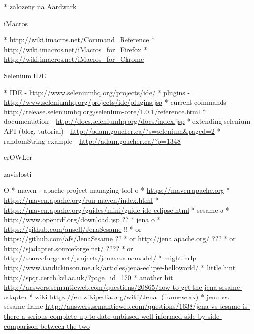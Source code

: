 \begitems
  * zalozeny na Aardwark 
\enditems


\secc iMacros

\begitems
  * \url{http://wiki.imacros.net/Command_Reference}
  * \url{http://wiki.imacros.net/iMacros_for_Firefox}
  * \url{http://wiki.imacros.net/iMacros_for_Chrome}
\enditems



%



\secc Selenium IDE

\begitems
  * IDE - \url{http://www.seleniumhq.org/projects/ide/}
  * plugins - \url{http://www.seleniumhq.org/projects/ide/plugins.jsp}
  * current commands - \url{http://release.seleniumhq.org/selenium-core/1.0.1/reference.html}
  * documentation - \url{http://docs.seleniumhq.org/docs/index.jsp}
  * extending selenium API (blog, tutorial) - \url{http://adam.goucher.ca/?s=selenium&paged=2}
  \begitems
    * randomString example - \url{http://adam.goucher.ca/?p=1348}
  \enditems
\enditems






\sec crOWLer

\secc zavislosti

\begitems \style O
  * maven - apache project managing tool
  \begitems \style o
    * \url{https://maven.apache.org}
    * \url{https://maven.apache.org/run-maven/index.html}
    * \url{https://maven.apache.org/guides/mini/guide-ide-eclipse.html}
  \enditems
  * sesame
  \begitems \style o
    * \url{http://www.openrdf.org/download.jsp} ??
  \enditems
  * jena
  \begitems \style o
    * \url{https://github.com/ansell/JenaSesame} !!
    * or \url{https://github.com/afs/JenaSesame} ??
    * or \url{http://jena.apache.org/} ???
    * or \url{http://sjadapter.sourceforge.net/} ????
    * or \url{http://sourceforge.net/projects/jenasesamemodel/}
    * might help \url{http://www.iandickinson.me.uk/articles/jena-eclipse-helloworld/}
    * little hint \url{http://spqr.cerch.kcl.ac.uk/?page_id=130}
    * another hit \url{http://answers.semanticweb.com/questions/20865/how-to-get-the-jena-sesame-adapter}
    * wiki \url{https://en.wikipedia.org/wiki/Jena_(framework)}
    * jena vs. sesame flame \url{http://answers.semanticweb.com/questions/1638/jena-vs-sesame-is-there-a-serious-complete-up-to-date-unbiased-well-informed-side-by-side-comparison-between-the-two}
  \enditems
\enditems


